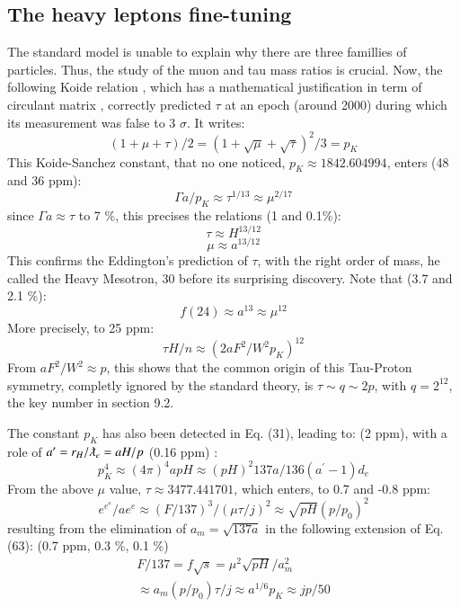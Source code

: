 \documentclass[twoside,draft]{article}
\begin{document}
\begin{sloppypar}
\subsection {The heavy leptons fine-tuning}
The standard model is unable to explain why there are three famillies of particles. Thus, the study of the muon and tau mass ratios is crucial. Now, the following Koide relation \cite{Koide}, which has a mathematical justification in term of circulant matrix \cite{Brannen}, correctly predicted $\tau$ at an epoch (around 2000) during which its measurement was false to 3 $\sigma$. It writes:
\begin{equation}
(1 + \mu + \tau)/2 = (1 + \sqrt\mu + \sqrt\tau)^2/3 = p_K
\end{equation}
This Koide-Sanchez constant, that no one noticed, $p_K \approx 1842.604994$, enters (48 and 36 ppm):
$$ \Gamma a/p_K \approx \tau^{1/13} \approx \mu^{2/17} $$
since $\Gamma a \approx \tau$ to 7 \%, this precises the relations (1 and 0.1\%):
$$ \tau \approx H^{13/12}$$
$$ \mu \approx  a^{13/12}$$
This confirms the Eddington's prediction of $\tau$, with the right order of mass, he called the Heavy Mesotron, 30 before its surprising discovery. Note that (3.7 and 2.1 \%):
$$ f(24) \approx a^{13} \approx \mu^{12}$$
More precisely, to 25 ppm:
$$\tau H/n \approx (2aF^2/W^2p_K)^{12}$$
From $aF^2/W^2 \approx p$, this shows that the common origin of this Tau-Proton symmetry, completly ignored by the standard theory, is $\tau \sim q \sim 2p$, with $q = 2^{12}$, the key number in section 9.2.   

The constant $p_K$ has also been detected in Eq. (31), leading to: (2 ppm), with a role of $a^{\prime} = r_H/\lambdabar_e = aH/p$ (0.16 ppm) :
\begin{equation}
p_K^4 \approx (4\pi)^4 apH \approx (pH)^2 137a/136(a^{\prime}-1) d_e
\end{equation}
From the above $\mu$ value, $\tau \approx 3477.441701$, which enters, to 0.7 and -0.8 ppm:
\begin{equation}
e^{e^e}/a e^e \approx (F/137)^{3}/ (\mu\tau/j)^2 \approx  \sqrt{pH} (p/p_0)^2 
\end{equation}
resulting from the elimination of $a_m = \sqrt{137a}$ in the following extension of Eq. (63): (0.7 ppm, 0.3 \%, 0.1 \%) 
$$
\begin{array}{ll}
%
\displaystyle
F/137 = f \sqrt{s} = \mu^2 \sqrt{pH}/a_m^2 \\ \approx a_m (p/p_0) \tau /j \approx a^{1/6}p_K \approx jp/50 
\end{array}
$$


\end{sloppypar}
\end{document}
